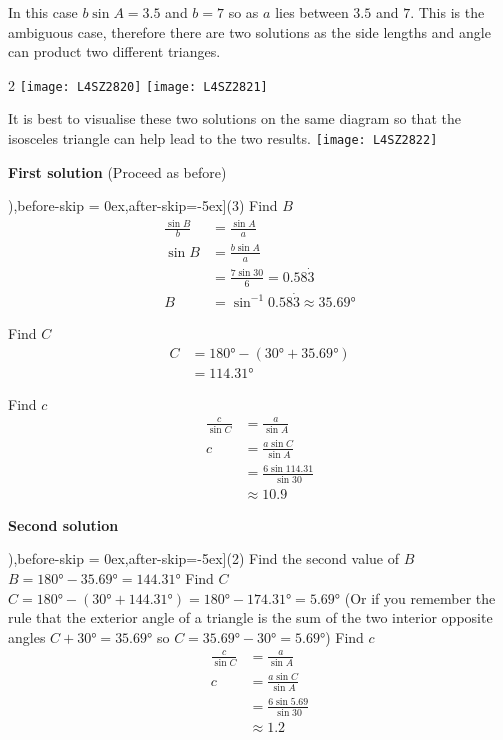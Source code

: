 \solution In this case $b \sin  A =3.5$ and $b =7$ so as $a$ lies between $3.5$ and $7$. This is the ambiguous case, therefore there are two solutions as the side lengths and angle can product two different trianges.
\columnsep =30pt
\begin {multicols}{2}
\texttt{[image: L4SZ2820]}
\texttt{[image: L4SZ2821]}
\end {multicols}
It is best to visualise these two solutions on the same diagram so that the isosceles triangle can help lead to the two results. 
\texttt{[image: L4SZ2822]}

\textbf{First solution} (Proceed as before) 
\begin{tasks}[counter-format=(tsk[1]),before-skip = {0ex},after-skip={-5ex}](3)
	\task Find $B$
\begin{align*}\frac{\sin  B}{b} &  = \frac{\sin  A}{a} \\
\sin  B &  = \frac{b \sin  A}{a} \\
&  = \frac{7 \sin  30 }{6} =0.58 \dot{3} \\
B &  = \sin ^{ -1} 0.58 \dot{3} \approx \ang{35.69} \end{align*}

\task Find $C$
\begin{align*}C &  = \ang{180}  -(\ang{30}  +\ang{35.69} ) \\
&  = \ang{114.31} \end{align*}

\task Find $c$
\begin{align*}\frac{c}{\sin  C} &  = \frac{a}{\sin  A} \\
c &  = \frac{a \sin  C}{\sin  A} \\
&  = \frac{6 \sin  114.31 }{\sin  30 } \\
&  \approx   10.9\end{align*}
\end{tasks}
\textbf{Second solution} 
\begin{tasks}[counter-format=(tsk[1]),before-skip = {0ex},after-skip={-5ex}](2)
	\task Find the second value of $B$ \\
$B =\ang{180}  -\ang{35.69}  =\ang{144.31} $
\task Find $C$\\
$C =\ang{180} -(\ang{30}  +\ang{144.31} ) =\ang{180}  -\ang{174.31}  =\ang{5.69} $
\task*[](Or if you remember the rule that the exterior angle of a triangle is the sum of the two interior opposite angles $C +\ang{30}  =\ang{35.69} $ so $C =\ang{35.69}  -\ang{30}  =\ang{5.69} $) 
\task*[(3)] Find $c$
\begin{align*}\frac{c}{\sin  C} &  = \frac{a}{\sin  A} \\
c &  = \frac{a \sin  C}{\sin  A} \\
&  = \frac{6 \sin  5.69 }{\sin  30 } \\
&  \approx   1.2\end{align*}
\end{tasks}

